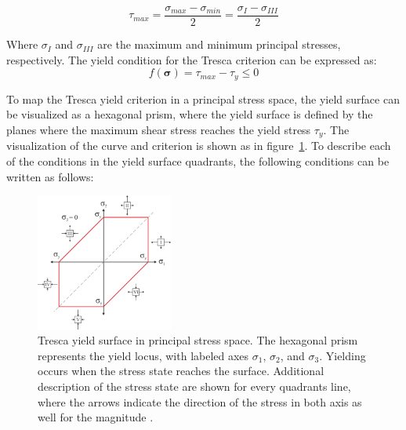 \documentclass[12pt]{article}
\begin{document}
\begin{equation}
    \tau_{max} = \frac{\sigma_{max} - \sigma_{min}}{2} = \frac{\sigma_{I} - \sigma_{III}}{2}
\end{equation}

Where $\sigma_{I}$ and $\sigma_{III}$ are the maximum and minimum principal stresses, respectively. The yield condition
for the Tresca criterion can be expressed as:
\begin{equation}
    f(\boldsymbol{\sigma}) = \tau_{max} - \tau_y \leq 0
\end{equation}


To map the Tresca yield criterion in a principal stress space, the yield surface can be visualized as a hexagonal prism,
where the yield surface is defined by the planes where the maximum shear stress reaches the yield stress $\tau_y$. The visualization of the curve and 
criterion is shown as in figure~\ref{fig:tresca_surface}. To describe each of the conditions in the yield surface quadrants, the following conditions can be written as follows:
\begin{figure}[H]
    \centering
    \includegraphics[width=0.4\textwidth]{images/TrescaSurface.png}
    \caption{Tresca yield surface in principal stress space. The hexagonal prism represents the yield locus, with labeled axes $\sigma_1$, $\sigma_2$, and $\sigma_3$. 
    Yielding occurs when the stress state reaches the surface. Additional description of the stress state
    are shown for every quadrants line, where the arrows indicate the direction of the stress in both axis as well
    for the magnitude \cite{hosford2005}.}
    \label{fig:tresca_surface}
\end{figure}
\end{document}
